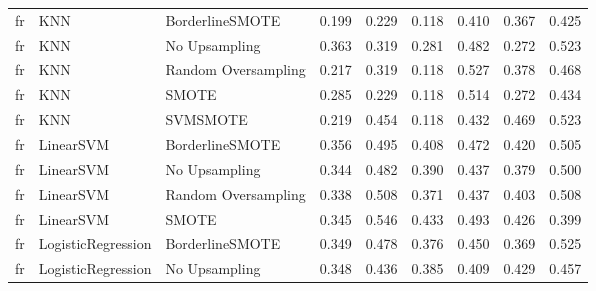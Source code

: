 \begin{tabular}{lllllllll}
      fr &                          KNN &     BorderlineSMOTE & 0.199 &                     0.229 &                 0.118 &                  0.410 &                                   0.367 &     0.425 \\
      fr &                          KNN &       No Upsampling & 0.363 &                     0.319 &                 0.281 &                  0.482 &                                   0.272 &     0.523 \\
      fr &                          KNN & Random Oversampling & 0.217 &                     0.319 &                 0.118 &                  0.527 &                                   0.378 &     0.468 \\
      fr &                          KNN &               SMOTE & 0.285 &                     0.229 &                 0.118 &                  0.514 &                                   0.272 &     0.434 \\
      fr &                          KNN &            SVMSMOTE & 0.219 &                     0.454 &                 0.118 &                  0.432 &                                   0.469 &     0.523 \\
      fr &                    LinearSVM &     BorderlineSMOTE & 0.356 &                     0.495 &                 0.408 &                  0.472 &                                   0.420 &     0.505 \\
      fr &                    LinearSVM &       No Upsampling & 0.344 &                     0.482 &                 0.390 &                  0.437 &                                   0.379 &     0.500 \\
      fr &                    LinearSVM & Random Oversampling & 0.338 &                     0.508 &                 0.371 &                  0.437 &                                   0.403 &     0.508 \\
      fr &                    LinearSVM &               SMOTE & 0.345 &                     0.546 &                 0.433 &                  0.493 &                                   0.426 &     0.399 \\
      fr &           LogisticRegression &     BorderlineSMOTE & 0.349 &                     0.478 &                 0.376 &                  0.450 &                                   0.369 &     0.525 \\
      fr &           LogisticRegression &       No Upsampling & 0.348 &                     0.436 &                 0.385 &                  0.409 &                                   0.429 &     0.457 \\

\end{tabular}
